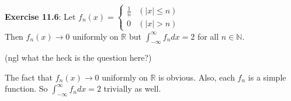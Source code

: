 \documentclass{book}
\newcommand{\exTwo}{%
   \color{RedViolet}%
   \fontsize{13}{15}\selectfont%
}
\newenvironment{myIndent}{%
   \begin{adjustwidth}{2.5em}{0em}%
}{%
   \end{adjustwidth}%
}
\newcommand{\mySepTwo}[1][.]{%
   {\noindent\color{#1}{\rule{6.5in}{0.5mm}}}\\%
}
\newcommand{\retTwo}{\hfill\bigbreak}
\begin{document}
\mySepTwo

\textbf{Exercise 11.6}: Let $f_n(x) = \left\{
\begin{matrix}
   \frac{1}{n} & (|x| \leq n) \\ 0 & (|x| > n)
\end{matrix}\right.$\\ Then $f_n(x) \rightarrow 0$ uniformly on $\mathbb{R}$ but $\int_{-\infty}^{\infty} f_ndx = 2$ for all $n \in \mathbb{N}$.\\ [-6pt]

{\begin{myIndent}\exTwo
   (ngl what the heck is the question here?)\retTwo

   The fact that $f_n(x) \rightarrow 0$ uniformly on $\mathbb{R}$ is obvious. Also, each $f_n$ is a simple\\ function. So $\int_{-\infty}^{\infty} f_ndx = 2$ trivially as well.
\end{myIndent}}
\end{document}
